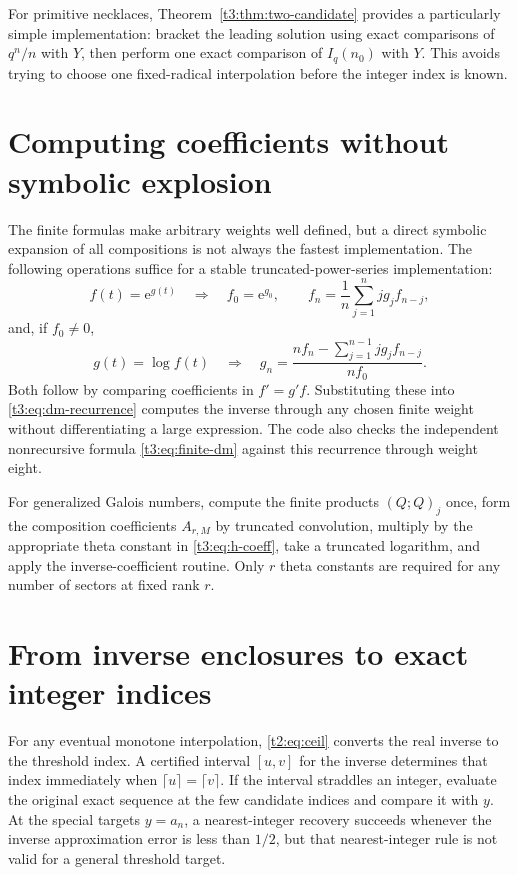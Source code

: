 \documentclass[11pt,openany]{book}
\numberwithin{equation}{chapter}
\theoremstyle{plain}
\theoremstyle{definition}
\theoremstyle{remark}
\newcommand{\ee}{\mathrm e}
\newcommand{\pp}[1]{(Q;Q)_{#1}}
\begin{document}
For primitive necklaces, Theorem~\ref{t3:thm:two-candidate} provides a particularly simple implementation: bracket the leading solution using exact comparisons of $q^n/n$ with $Y$, then perform one exact comparison of $I_q(n_0)$ with $Y$. This avoids trying to choose one fixed-radical interpolation before the integer index is known.

\section{Computing coefficients without symbolic explosion}

The finite formulas make arbitrary weights well defined, but a direct symbolic expansion of all compositions is not always the fastest implementation. The following operations suffice for a stable truncated-power-series implementation:
\begin{equation}\label{t3:eq:seriesexpalgorithm}
 f(t)=\ee^{g(t)}\quad\Longrightarrow\quad
 f_0=\ee^{g_0},\qquad
 f_n=\frac1n\sum_{j=1}^n jg_jf_{n-j},
\end{equation}
and, if $f_0\ne0$,
\begin{equation}\label{t3:eq:serieslogalgorithm}
 g(t)=\log f(t)\quad\Longrightarrow\quad
 g_n=\frac{nf_n-\sum_{j=1}^{n-1}jg_jf_{n-j}}{nf_0}.
\end{equation}
Both follow by comparing coefficients in $f'=g'f$. Substituting these into
\eqref{t3:eq:dm-recurrence} computes the inverse through any chosen finite weight without differentiating a large expression. The code also checks the independent nonrecursive formula \eqref{t3:eq:finite-dm} against this recurrence through weight eight.

For generalized Galois numbers, compute the finite products $\pp{j}$ once, form the composition coefficients $A_{r,M}$ by truncated convolution, multiply by the appropriate theta constant in \eqref{t3:eq:h-coeff}, take a truncated logarithm, and apply the inverse-coefficient routine. Only $r$ theta constants are required for any number of sectors at fixed rank $r$.
\section{From inverse enclosures to exact integer indices}
For any eventual monotone interpolation, \eqref{t2:eq:ceil} converts the real inverse to the threshold index. A certified interval $[u,v]$ for the inverse determines that index immediately when $\lceil u\rceil=\lceil v\rceil$. If the interval straddles an integer, evaluate the original exact sequence at the few candidate indices and compare it with $y$. At the special targets $y=a_n$, a nearest-integer recovery succeeds whenever the inverse approximation error is less than $1/2$, but that nearest-integer rule is not valid for a general threshold target.
\end{document}
